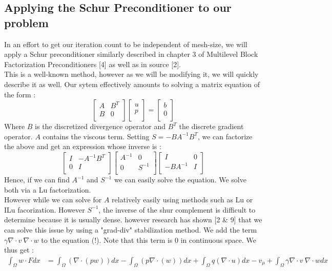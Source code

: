 \documentclass[11pt,twoside,a4paper]{article}
\begin{document}
\subsection{Applying the Schur Preconditioner to our problem}
In an effort to get our iteration count to be independent of mesh-size, we will apply a Schur preconditioner similarly described in chapter 3 of Multilevel Block Factorization Preconditioners [4] as well as in source [2].\\
This is a well-known method, however as we will be modifying it, we will quickly describe it as well.
Our sytem effectively amounts to solving a matrix equation of the form :
$$ 
\begin{bmatrix} 
A         & B^{T}\\
B         & 0 \\
\end{bmatrix}
\begin{bmatrix} 
u    \\
p     \\  
\end{bmatrix}
=
\begin{bmatrix} 
b    \\
0     \\  
\end{bmatrix}
$$
Where $B$ is the discretized divergence operator and $B^T$ the discrete gradient operator. $A$ contains the viscous term.
Setting $S = - B A^{-1} B^{T}$, we can factorize the above and get an expression whose inverse is : 
$$
\begin{bmatrix} 
I         & - A^{-1} B^{T}\\
0         & I \\
\end{bmatrix}
\begin{bmatrix} 
A^{-1}   & 0\\
0       & S^{-1} \\
\end{bmatrix}
\begin{bmatrix} 
I & 0\\
 - B A^{-1}       & I \\
\end{bmatrix}
$$
Hence, if we can find $A^{-1}$ and $S^{-1}$ we can easily solve the equation. We solve both via a Lu factorization.\\
However while we can solve for $A$ relatively easily using methods such as Lu or ILu facorization. However $S^{-1}$, the inverse of the shur complement is difficult to determine because it is usually dense. however research has shown [2 \& 9] that we can solve this issue by using a "grad-div" stabilization method. We add the term $\gamma \nabla \cdot v \: \nabla \cdot w$ to the equation (!). Note that this term is 0 in continuous space. We thus get : 
\begin{align}
\int_\Omega w \cdot F dx &= \int_\Omega (\nabla \cdot (p w)) dx - \int_\Omega ( p \nabla \cdot (w)) dx + \int_\Omega q (\nabla \cdot u) dx  - v_\mu + \int_\Omega \gamma \nabla \cdot v \: \nabla \cdot w dx
\end{align}
\end{document}
